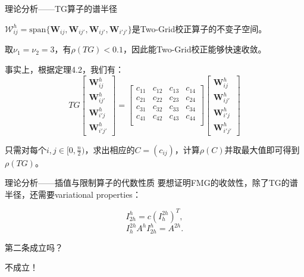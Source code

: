 \documentclass[9pt]{beamer}
\begin{document}
\begin{frame}{理论分析——TG算子的谱半径}
  \begin{theorem}
    \small
    $\mathcal{W}_{ij}^h=\text{span}\{\mathbf{W}_{ij},\mathbf{W}_{ij'},\mathbf{W}_{ij'},\mathbf{W}_{i'j'}\}$是Two-Grid校正算子的不变子空间。
  \end{theorem}

  \pause
  \begin{lemma}
    \small
    取$\nu_1=\nu_2=3$，有$\rho(TG)<0.1$，因此能Two-Grid校正能够快速收敛。
  \end{lemma}

  \pause
  \small
  事实上，根据定理4.2，我们有：
  \begin{equation}
    TG\begin{bmatrix}
      \mathbf{W}_{ij}^h\\
      \mathbf{W}_{ij'}^h\\
      \mathbf{W}_{i'j}^h\\
      \mathbf{W}_{i'j'}^h
    \end{bmatrix} = 
    \begin{bmatrix}
      c_{11} & c_{12} & c_{13} & c_{14}\\
      c_{21} & c_{22} & c_{23} & c_{24}\\
      c_{31} & c_{32} & c_{33} & c_{34}\\
      c_{41} & c_{42} & c_{43} & c_{44}\\
    \end{bmatrix}
    \begin{bmatrix}
      \mathbf{W}_{ij}^h\\
      \mathbf{W}_{ij'}^h\\
      \mathbf{W}_{i'j}^h\\
      \mathbf{W}_{i'j'}^h
    \end{bmatrix}
  \end{equation}

  只需对每个$i,j\in[0,\frac{n}{2})$，求出相应的$C=(c_{ij})$，计算$\rho(C)$并取最大值即可得到$\rho(TG)$。
\end{frame}

\begin{frame}{理论分析——插值与限制算子的代数性质}
\small
要想证明FMG的收敛性，除了TG的谱半径，还需要variational properties：

\begin{equation}
  I_{2h}^h=c(I_h^{2h})^T,
\end{equation}
\begin{equation}
  I_h^{2h}A^hI_{2h}^h=A^{2h}.
\end{equation}

第二条成立吗？

\vspace{1em}
\pause

不成立！
\end{frame}
\end{document}
